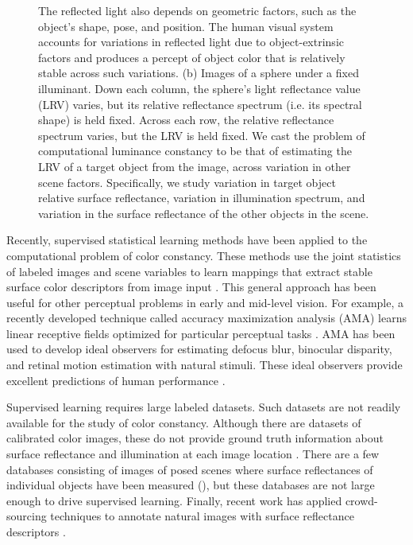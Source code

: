 \documentclass{jov}
\begin{document}
\begin{figure}
{The reflected light also depends on geometric factors, such as the object's shape, pose, and position. 
The human visual system accounts for variations in reflected light due to object-extrinsic factors and produces a percept of object color that is relatively stable across such variations. 
(b) Images of a sphere under a fixed illuminant.  
Down each column, the sphere's light reflectance value (LRV) varies, but its relative reflectance spectrum (i.e. its spectral shape) is held fixed.
Across each row, the relative reflectance spectrum varies, but the LRV is held fixed.
We cast the problem of computational luminance constancy to be that of estimating the LRV of a target object from the image, across variation in other scene factors. 
Specifically, we study variation in target object relative surface reflectance, variation in illumination spectrum, and variation in the surface reflectance of the other objects in the scene.}
 \end{figure}

Recently, supervised statistical learning methods have been applied to the computational problem of color constancy.
These methods use the joint statistics of labeled images and scene variables to learn mappings that extract stable surface color descriptors from image input \cite{barron2015convolutional}.
This general approach has been useful for other perceptual problems in early and mid-level vision.
For example, a recently developed technique called accuracy maximization analysis (AMA) learns linear receptive fields optimized for particular perceptual tasks \cite{geisler2009optimal,burge2017accuracy,jaini2017linking}. AMA has been used to develop ideal observers for estimating defocus blur, binocular disparity, and retinal motion estimation with natural stimuli. These ideal observers provide excellent predictions of human performance \cite{burge2011optimal, burge2012optimal, burge2014optimal, burge2015optimal}.

Supervised learning requires large labeled datasets. Such datasets are not readily available for the study of color constancy. Although there are datasets of calibrated color images, these do not provide ground truth information about surface reflectance and illumination at each image location \cite{ChakrabartiHyperspectral,NascimentoFoster2016,ParragaHyperspectralData,TkacikUpennHypersepctralData,skauli2013collection,olmos2004biologically}. There are a few databases consisting of images of posed scenes where surface reflectances of individual objects have been measured (), but these databases are not large enough to drive supervised learning. Finally, recent work has applied crowd-sourcing techniques to annotate natural images with surface reflectance descriptors \cite{bell2014intrinsic}.
\end{document}
